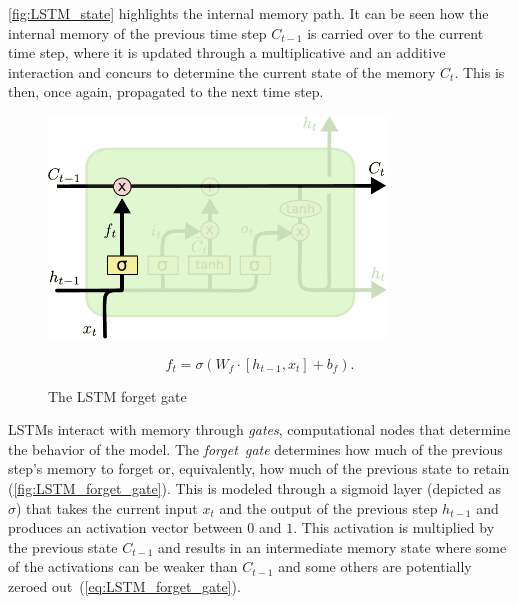 \autoref{fig:LSTM_state} highlights the internal memory path. It can be seen
how the internal memory of the previous time step $C_{t-1}$ is carried over to
the current time step, where it is updated through a multiplicative and an
additive interaction and concurs to determine the current state of the memory
$C_t$. This is then, once again, propagated to the next time step.

\begin{figure}[p]
\begin{minipage}{0.5\textwidth}
    \centering
    \includegraphics[width=0.8\textwidth]{pdf/LSTM_forget_gate.pdf}
    \caption{The LSTM forget gate\label{fig:LSTM_forget_gate}}
\end{minipage}
\begin{minipage}{0.5\textwidth}
    \setlength\abovedisplayshortskip{0pt}
    \setlength\belowdisplayshortskip{0pt}
    \strut
    \begin{equation}\label{eq:LSTM_forget_gate}
        f_t = \sigma\left(W_f \cdot \left[h_{t-1}, x_t\right] + b_f \right).
    \end{equation}
    \strut
\end{minipage}
\end{figure}

LSTMs interact with memory through \emph{gates}, computational nodes that
determine the behavior of the model. The \emph{forget~gate} determines how much
of the previous step's memory to forget or, equivalently, how much of the
previous state to retain (\autoref{fig:LSTM_forget_gate}). This is modeled
through a sigmoid layer (depicted as $\sigma$) that takes the current input
$x_t$ and the output of the previous step $h_{t-1}$ and produces an activation
vector between $0$ and $1$. This activation is multiplied by the previous state
$C_{t-1}$ and results in an intermediate memory state where some of the
activations can be weaker than $C_{t-1}$ and some others are potentially zeroed
out~(\autoref{eq:LSTM_forget_gate}).


